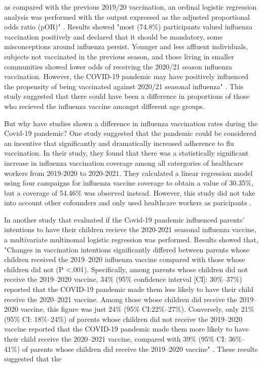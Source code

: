 \documentclass[12pt]{article}
\begin{document}
as compared with the previous 2019/20 vaccination, an ordinal logistic regression analysis was performed with the output expressed as the adjusted proportional odds ratio (pOR)" \citep{domnich2020attitudes}. Results showed "most (74.8\%) participants valued 
influenza vaccination positively and declared that it should be mandatory, some misconceptions around influenza persist. Younger and less affluent individuals, subjects not vaccinated in the previous season, and those living in smaller communities showed lower 
odds of receiving the 2020/21 season influenza vaccination. However, the COVID-19 pandemic may have positively influenced the propensity of being vaccinated against 2020/21 seasonal influenza" \citep{domnich2020attitudes}. This study suggested that there could have 
been a difference in proportions of those who recieved the influenza vaccine amongst different age groups. \par
But why have studies shown a difference in influenza vaccination rates during the Covid-19 pandemic?  One study suggested that the pandemic could be considered an incentive that significantly and dramatically increased adherence to flu vaccination. In their study, they found
that there was a statistically significant increase in influenza vaccination coverage among all catergories of healthcare workers from 2019-2020 to 2020-2021. They calculated a linear regression model using four campaigns for influenza vaccine coverage to obtain a value of 30.35\%, but
a coverage of 54.46\% was observed instead. However, this study did not take into account other cofounders and only used healthcare workers as paricipants \citep{di2021covid}. \par
In another study that evaluated if the Covid-19 pandemic influenced parents' intentions to have their children recieve the 2020-2021 seasonal influenza vaccine, a multivariate multinomal logistic regression was performed. Results showed that, "Changes in vaccination intentions significantly
differed between parents whose children received the 2019–2020 influenza vaccine compared with those whose children did not (P <.001). Specifically, among parents whose children did not receive the 2019–2020 vaccine, 34\% (95\% confidence interval [CI]: 30\%–37\%) reported that the COVID-19
pandemic made them less likely to have their child receive the 2020–2021 vaccine. Among those whose children did receive the 2019–2020 vaccine, this figure was just 24\% (95\% CI:22\%–27\%). Conversely, only 21\% (95\% CI: 18\%–24\%) of parents whose children did not
receive the 2019–2020 vaccine reported that the COVID-19 pandemic made them more likely to have their child receive the 2020–2021 vaccine, compared with 39\% (95\% CI: 36\%–41\%) of parents whose children did receive the 2019–2020 vaccine" \citep{sokol2020covid}. These results suggested that the 
\end{document}
